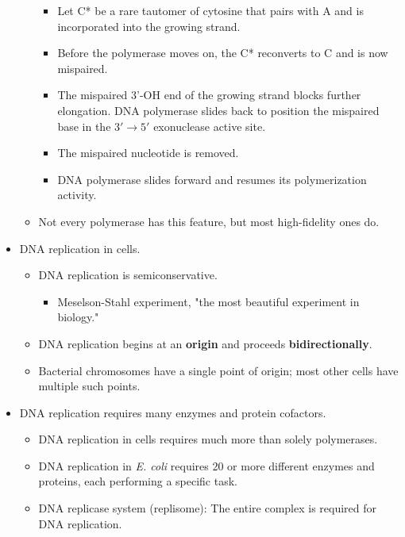 \documentclass[../notes.tex]{subfiles}
\begin{document}
\begin{itemize}
\begin{itemize}
\begin{itemize}
            \item Let C* be a rare tautomer of cytosine that pairs with A and is incorporated into the growing strand.
            \item Before the polymerase moves on, the C* reconverts to C and is now mispaired.
            \item The mispaired 3'-OH end of the growing strand blocks further elongation. DNA polymerase slides back to position the mispaired base in the $3'\to 5'$ exonuclease active site.
            \item The mispaired nucleotide is removed.
            \item DNA polymerase slides forward and resumes its polymerization activity.
        \end{itemize}
        \item Not every polymerase has this feature, but most high-fidelity ones do.
    \end{itemize}
    \item DNA replication in cells.
    \begin{itemize}
        \item DNA replication is semiconservative.
        \begin{itemize}
            \item Meselson-Stahl experiment, "the most beautiful experiment in biology."
        \end{itemize}
        \item DNA replication begins at an \textbf{origin} and proceeds \textbf{bidirectionally}.
        \item Bacterial chromosomes have a single point of origin; most other cells have multiple such points.
    \end{itemize}
    \item DNA replication requires many enzymes and protein cofactors.
    \begin{itemize}
        \item DNA replication in cells requires much more than solely polymerases.
        \item DNA replication in \emph{E. coli} requires 20 or more different enzymes and proteins, each performing a specific task.
        \item DNA replicase system (replisome): The entire complex is required for DNA replication.

\end{itemize}
\end{itemize}
\end{document}
